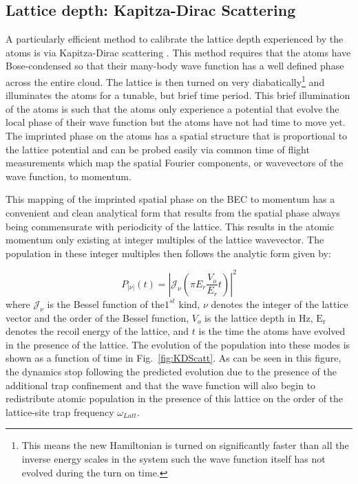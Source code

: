 \subsection{Lattice depth: Kapitza-Dirac Scattering}

A particularly efficient method to calibrate the lattice depth experienced by the atoms is via Kapitza-Dirac scattering \cite{Kozuma1999,Ovchinnikov1999,Stenger1999,Gupta2001,Gadway2009}. This method requires that the atoms have Bose-condensed so that their many-body wave function has a well defined phase across the entire cloud. The lattice is then turned on very diabatically\footnote{This means the new Hamiltonian is turned on significantly faster than all the inverse energy scales in the system such the wave function itself has not evolved during the turn on time.} and illuminates the atoms for a tunable, but brief time period. This brief illumination of the atoms is such that the atoms only experience a potential that evolve the local phase of their wave function but the atoms have not had time to move yet. The imprinted phase on the atoms has a spatial structure that is proportional to the lattice potential and can be probed easily via common time of flight measurements which map the spatial Fourier components, or wavevectors of the wave function, to momentum. 

This mapping of the imprinted spatial phase on the BEC to momentum has a convenient and clean analytical form that results from the spatial phase always being commensurate with periodicity of the lattice. This results in the atomic momentum only existing at integer multiples of the lattice wavevector. The population in these integer multiples then follows the analytic form given by:

\begin{equation}
\label{eqn:KDanalytic}
P_{|\nu|}(t)= \left | \mathcal{J}_\nu \left ( \pi E_r \frac{V_o}{E_r} t \right ) \right |^2
\end{equation}
where $\mathcal{J}_\nu$ is the Bessel function of the$1^{st}$ kind, $\nu$ denotes the integer of the lattice vector and the order of the Bessel function, $V_o$ is the lattice depth in Hz, $\mathrm{E_r}$ denotes the recoil energy of the lattice, and $t$ is the time the atoms have evolved in the presence of the lattice. The evolution of the population into these modes is shown as a function of time in Fig.~\ref{fig:KDScatt}. As can be seen in this figure, the dynamics stop following the predicted evolution due to the presence of the additional trap confinement and that the wave function will also begin to redistribute atomic population in the presence of this lattice on the order of the lattice-site trap frequency $\omega_{Latt}$.

